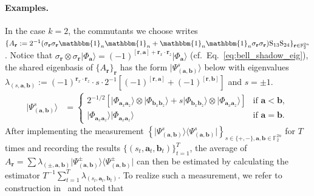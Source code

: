 \documentclass[aps,%
twocolumn,%
floatfix,%
pra,%
amsfonts,%
groupedaddress,%
superscriptaddress]{revtex4-2}%
\newcommand{\bra}[1]{\langle #1\rvert}
\newcommand{\ket}[1]{\lvert #1\rangle}
\newcommand{\1}{\mathbbm{1}}
\begin{document}
\paragraph{Examples.}
 In the case $k = 2$, the commutants we choose writes $\{A_{\mathbf{r}} := {2}^{-1}{(\sigma_{\mathbf{r}}\sigma_{\mathbf{r}}\1_n\1_n + \1_n\1_n\sigma_{\mathbf{r}}\sigma_{\mathbf{r}})} \mathrm{S}_{13}\mathrm{S}_{24}\}_{\mathbf{r} \in \mathbb{F}_2^{2n}}$. Notice that $\sigma_{\mathbf{r}} \otimes \sigma_{\mathbf{r}} \ket{\Phi_{\mathbf{a}}} = (-1)^{[\mathbf{r},\mathbf{a}] + \mathbf{r}_x\cdot\mathbf{r}_z}\ket{\Phi_{\mathbf{a}}}$ (cf.\ Eq.~\eqref{eq:bell_shadow_eig}),
the shared eigenbasis of $\{A_\mathbf{r}\}_\mathbf{r}$ has the form $\ket{\Psi^{s}_{(\mathbf{a}, \mathbf{b})}}$ below with eigenvalues $\lambda_{(s,\mathbf{a},\mathbf{b})} :=(-1)^{\mathbf{r}_x\cdot\mathbf{r}_z}\cdot s \cdot 2^{-1}[(-1)^{[\mathbf{r}, \mathbf{a}]} + (-1)^{[\mathbf{r}, \mathbf{b}]}] $ and $s = \pm 1$.
\begin{align}
   \ket{\Psi^{s}_{(\mathbf{a}, \mathbf{b})}}&= 
   \begin{cases}   
    {2^{-1/2}}\left[{\ket{\Phi_{\mathbf{a}_x \mathbf{a}_z}} \otimes \ket{\Phi_{\mathbf{b}_x\mathbf{b}_z} }+s \ket{\Phi_{\mathbf{b}_x \mathbf{b}_z}} \otimes \ket{\Phi_{\mathbf{a}_x\mathbf{a}_z}}}\right] & \text{if~} \mathbf{a} < \mathbf{b}, \\ 
    \ket{\Phi_{\mathbf{a}_x \mathbf{a}_z}}\ket{\Phi_{\mathbf{a}_x \mathbf{a}_z}}& \text{if~} \mathbf{a} = \mathbf{b}.
\end{cases}
\end{align}
After implementing the measurement $\left\{\ket{\Psi^{s}_{(\mathbf{a}, \mathbf{b})}} \bra{\Psi^{s}_{(\mathbf{a}, \mathbf{b})}}\right\}_{s \in \{+,-\}, \mathbf{a},\mathbf{b} \in \mathbb{F}_2^{2n}}$ for $T$ times and recording the results $\{(s_t,\mathbf{a}_t, \mathbf{b}_t)\}_{t = 1}^{T}$, the average of $A_{\mathbf{r}} = \sum \lambda_{(\pm,\mathbf{a},\mathbf{b})} \ket{\Psi^{\pm}_{(\mathbf{a}, \mathbf{b})}} \bra{\Psi^{\pm}_{(\mathbf{a}, \mathbf{b})}}$ can then be estimated by calculating the estimator $T^{-1}\sum_{t = 1}^{T} \lambda_{(s_t, \mathbf{a}_t,\mathbf{b}_t)} $.
To realize such a measurement, we refer to construction in~\cite{liu2024auxiliary} and noted that 
\end{document}
